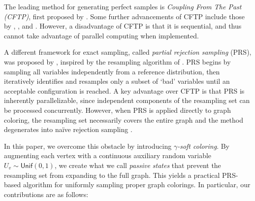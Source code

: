 \documentclass[12pt, a4paper]{article}
\theoremstyle{plain}
\theoremstyle{definition}
\theoremstyle{remark}
\newcommand{\unif}{\mathsf{Unif}}
\begin{document}
The leading method for generating perfect samples is {\em Coupling From The Past (CFTP)}, first proposed by \cite{PW96}. Some further advancements of CFTP include those by \cite{MH96}, \cite{JSS21}, and \cite{BC20}. However, a disadvantage of CFTP is that it is sequential, and thus cannot take advantage of parallel computing when implemented.

A different framework for exact sampling, called {\em partial rejection sampling} (PRS), was proposed by \cite{GJL17}, inspired by the resampling algorithm of \cite{MT10}. PRS begins by sampling all variables independently from a reference distribution, then iteratively identifies and resamples only a subset of `bad' variables until an acceptable configuration is reached. A key advantage over CFTP is that PRS is inherently parallelizable, since independent components of the resampling set can be processed concurrently. However, when PRS is applied directly to graph coloring, the resampling set necessarily covers the entire graph and the method degenerates into na\"{i}ve rejection sampling \cite{GJL17,BC20}.

In this paper, we overcome this obstacle by introducing {\em \(\gamma\)-soft coloring}. By augmenting each vertex with a continuous auxiliary random variable \(U_v\sim\unif(0,1)\), we create what we call {\em passive states} that prevent the resampling set from expanding to the full graph. This yields a practical PRS-based algorithm for uniformly sampling proper graph colorings. In particular, our contributions are as follows:
\end{document}
